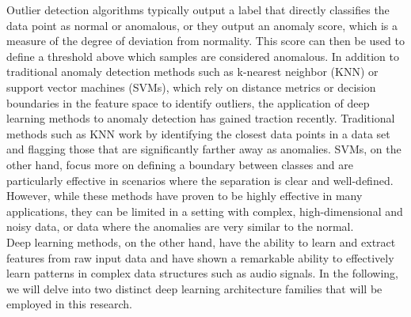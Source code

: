 Outlier detection algorithms typically output a label that directly classifies the data point as normal or anomalous, or they output an anomaly score, which is a measure of the degree of deviation from normality. This score can then be used to define a threshold above which samples are considered anomalous. In addition to traditional anomaly detection methods such as k-nearest neighbor (KNN) or support vector machines (SVMs), which rely on distance metrics or decision boundaries in the feature space to identify outliers, the application of deep learning methods to anomaly detection has gained traction recently. Traditional methods such as KNN work by identifying the closest data points in a data set and flagging those that are significantly farther away as anomalies. SVMs, on the other hand, focus more on defining a boundary between classes and are particularly effective in scenarios where the separation is clear and well-defined.~\cite{chandola2009anomaly} However, while these methods have proven to be highly effective in many applications, they can be limited in a setting with complex, high-dimensional and noisy data, or data where the anomalies are very similar to the normal.\\
Deep learning methods, on the other hand, have the ability to learn and extract features from raw input data and have shown a remarkable ability to effectively learn patterns in complex data structures such as audio signals. In the following, we will delve into two distinct deep learning architecture families that will be employed in this research.


